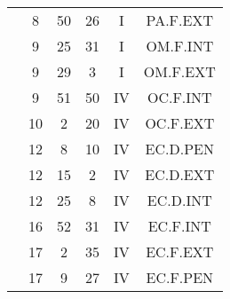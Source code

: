 \documentclass[12pt, a4paper]{article}
\begin{document}
\begin{multicols}{3}
{\begin{tabular}{c c c c c c}
	 	 	 	 & 8 & 50 & 26 & I & PA.F.EXT\\%
	 	 	 	 & 9 & 25 & 31 & I & OM.F.INT\\%
	 	 	 	 & 9 & 29 & 3 & I & OM.F.EXT\\%
	 	 	 	 & 9 & 51 & 50 & IV & OC.F.INT\\%
	 	 	 	 & 10 & 2 & 20 & IV & OC.F.EXT\\%
	 	 	 	 & 12 & 8 & 10 & IV & EC.D.PEN\\%
	 	 	 	 & 12 & 15 & 2 & IV & EC.D.EXT\\%
	 	 	 	 & 12 & 25 & 8 & IV & EC.D.INT\\%
	 	 	 	 & 16 & 52 & 31 & IV & EC.F.INT\\%
	 	 	 	 & 17 & 2 & 35 & IV & EC.F.EXT\\%
	 	 	 	 & 17 & 9 & 27 & IV & EC.F.PEN\\%
	 	 \end{tabular}
 	}
\end{multicols}
\end{document}

